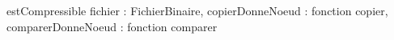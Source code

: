 

\begin{algorithme}
\fonction
{estCompressible}
{fichier : FichierBinaire, copierDonneNoeud : fonction copier, comparerDonneNoeud : fonction comparer}
{\entier}
{}
{
}

\end{algorithme}
